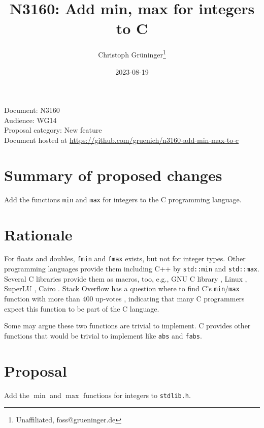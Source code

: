 \documentclass[a4paper,10pt]{scrartcl}
\title{N3160: Add min, max for integers to C}
\author{Christoph Grüninger\footnote{Unaffiliated, foss@grueninger.de}}
\date{2023-08-19}
\begin{document}
\lstset{language=C,basicstyle=\ttfamily}

\maketitle

\noindent
Document: N3160\\
Audience: WG14\\
Proposal category: New feature\\
Document hosted at \url{https://github.com/gruenich/n3160-add-min-max-to-c}

\section{Summary of proposed changes}

Add the functions \lstinline{min} and \lstinline{max} for integers to the C programming language.

\section{Rationale}

For floats and doubles, \lstinline{fmin} and \lstinline{fmax} exists, but not for integer types. Other
programming languages provide them including C++ by \lstinline{std::min} and \lstinline{std::max}. Several
C libraries provide them as macros, too, e.g., GNU C library \cite{GLibc}, Linux \cite{Linux},
SuperLU \cite{SuperLU}, Cairo \cite{Cairo}.
Stack Overflow has a question where to find C's \lstinline{min}/\lstinline{max} function with more
than 400 up-votes \cite{Stackoverflow}, indicating that many C programmers expect this function to be
part of the C language.

Some may argue these two functions are trivial to implement. C provides other functions that would be
trivial to implement like \lstinline{abs} and \lstinline{fabs}.

\section{Proposal}
Add the $\operatorname{min}$ and $\operatorname{max}$ functions for integers to \lstinline{stdlib.h}.
\end{document}
